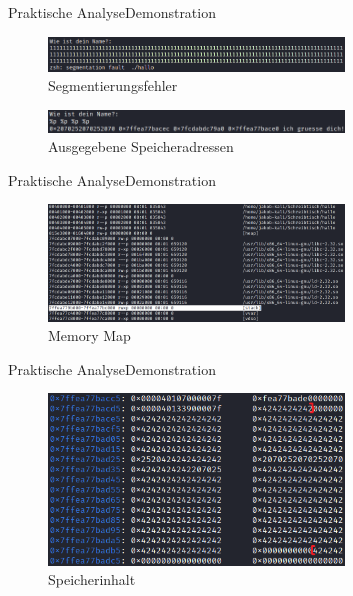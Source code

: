 \begin{frame}{Praktische Analyse}{Demonstration}
    \begin{figure}[h]
        \centering
        \includegraphics[width=0.7\textwidth,height=0.75\textheight,keepaspectratio]{images/segfault.png}
        \caption{Segmentierungsfehler}
    \end{figure}
    \begin{figure}[h]
        \centering
        \includegraphics[width=0.7\textwidth,height=0.75\textheight,keepaspectratio]{images/adressen.png}
        \caption{Ausgegebene Speicheradressen}
    \end{figure}
\end{frame}

\begin{frame}{Praktische Analyse}{Demonstration}
    \begin{figure}[h]
        \centering
        \includegraphics[width=0.7\textwidth,height=0.75\textheight,keepaspectratio]{images/map.png}
        \caption{Memory Map}
    \end{figure}
\end{frame}

\begin{frame}{Praktische Analyse}{Demonstration}
    \begin{figure}[h]
        \centering
        \includegraphics[width=0.7\textwidth,height=0.75\textheight,keepaspectratio]{images/buffer.png}
        \caption{Speicherinhalt}
    \end{figure}
\end{frame}

